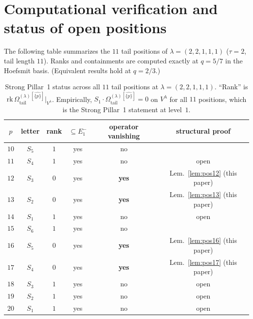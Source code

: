 \documentclass[11pt]{article}
\theoremstyle{definition}
\newcommand{\Vlam}{V^\lambda}
\newcommand{\Omtail}{\Omega^{(\lambda)}_{\mathrm{tail}}}
\newcommand{\Eminus}[1]{E^-_{#1}}
\begin{document}
\section{Computational verification and status of open positions}

The following table summarizes the $11$ tail positions of $\lambda = (2,2,1,1,1)$
($\tau = 2$, tail length $11$). Ranks and containments are computed exactly at
$q = 5/7$ in the Hoefsmit basis. (Equivalent results hold at $q = 2/3$.)

\begin{table}[h]
\centering\renewcommand{\arraystretch}{1.2}
\caption{Strong Pillar~1 status across all $11$ tail positions at
$\lambda = (2,2,1,1,1)$. ``Rank'' is $\mathrm{rk}\,\Omtail^{[\widehat{\{p\}}]}|_{\Vlam}$.
Empirically, $S_1 \cdot \Omtail^{[\widehat{\{p\}}]} = 0$ on $\Vlam$ for all $11$
positions, which is the Strong Pillar~1 statement at level~$1$.}
\begin{tabular}{cccccc}
\toprule
$p$ & letter & rank & $\subseteq \Eminus 1$ & operator vanishing & structural proof \\
\midrule
$10$ & $S_5$ & $1$ & yes & no & \cite[Lem.~\ref{lem:pos10}]{persubset} \\
$11$ & $S_4$ & $1$ & yes & no & open \\
$12$ & $S_3$ & $0$ & yes & \textbf{yes} & Lem.~\ref{lem:pos12} (this paper) \\
$13$ & $S_2$ & $0$ & yes & \textbf{yes} & Lem.~\ref{lem:pos13} (this paper) \\
$14$ & $S_1$ & $1$ & yes & no & open \\
$15$ & $S_6$ & $1$ & yes & no & \cite[Lem.~\ref{lem:pos15}]{persubset} \\
$16$ & $S_5$ & $0$ & yes & \textbf{yes} & Lem.~\ref{lem:pos16} (this paper) \\
$17$ & $S_4$ & $0$ & yes & \textbf{yes} & Lem.~\ref{lem:pos17} (this paper) \\
$18$ & $S_3$ & $1$ & yes & no & open \\
$19$ & $S_2$ & $1$ & yes & no & open \\
$20$ & $S_1$ & $1$ & yes & no & open \\
\bottomrule
\end{tabular}
\end{table}
\end{document}
